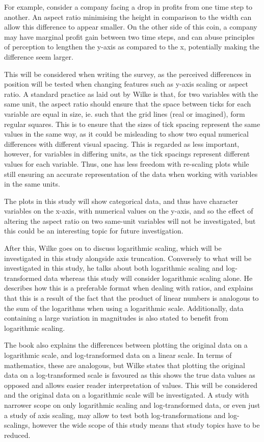 \documentclass[
  11pt,
]{book}
\begin{document}
For example, consider a company facing a drop in profits from one time
step to another. An aspect ratio minimising the height in comparison to
the width can allow this difference to appear smaller. On the other side
of this coin, a company may have marginal profit gain between two time
steps, and can abuse principles of perception to lengthen the y-axis as
compared to the x, potentially making the difference seem larger.

This will be considered when writing the survey, as the perceived
differences in position will be tested when changing features such as
y-axis scaling or aspect ratio. A standard practice as laid out by Wilke
is that, for two variables with the same unit, the aspect ratio should
ensure that the space between ticks for each variable are equal in size,
ie. such that the grid lines (real or imagined), form regular squares.
This is to ensure that the sizes of tick spacing represent the same
values in the same way, as it could be misleading to show two equal
numerical differences with different visual spacing. This is regarded as
less important, however, for variables in differing units, as the tick
spacings represent different values for each variable. Thus, one has
less freedom with re-scaling plots while still ensuring an accurate
representation of the data when working with variables in the same
units.

The plots in this study will show categorical data, and thus have
character variables on the x-axis, with numerical values on the y-axis,
and so the effect of altering the aspect ratio on two same-unit
variables will not be investigated, but this could be an interesting
topic for future investigation.

After this, Wilke goes on to discuss logarithmic scaling, which will be
investigated in this study alongside axis truncation. Conversely to what
will be investigated in this study, he talks about both logarithmic
scaling and log-transformed data whereas this study will consider
logarithmic scaling alone. He describes how this is a preferable format
when dealing with ratios, and explains that this is a result of the fact
that the product of linear numbers is analogous to the sum of the
logarithms when using a logarithmic scale. Additionally, data containing
a large variation in magnitudes is also stated to benefit from
logarithmic scaling.

The book also explains the differences between plotting the original
data on a logarithmic scale, and log-transformed data on a linear scale.
In terms of mathematics, these are analogous, but Wilke states that
plotting the original data on a log-transformed scale is favoured as
this shows the true data values as opposed and allows easier reader
interpretation of values. This will be considered and the original data
on a logarithmic scale will be investigated. A study with narrower scope
on only logarithmic scaling and log-transformed data, or even just a
study of axis scaling, may allow to test both log-transformations and
log-scalings, however the wide scope of this study means that study
topics have to be reduced.
\end{document}
